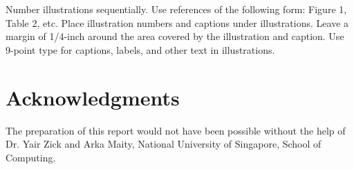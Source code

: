 \documentclass{article}
\begin{document}
Number illustrations sequentially. Use references of the following
form: Figure 1, Table 2, etc. Place illustration numbers and captions
under illustrations. Leave a margin of 1/4-inch around the area
covered by the illustration and caption.  Use 9-point type for
captions, labels, and other text in illustrations.
\fi

\section*{Acknowledgments}

The preparation of this report would not have been possible without the help of Dr. Yair Zick and Arka Maity, National University of Singapore, School of Computing.

\appendix

\end{document}
